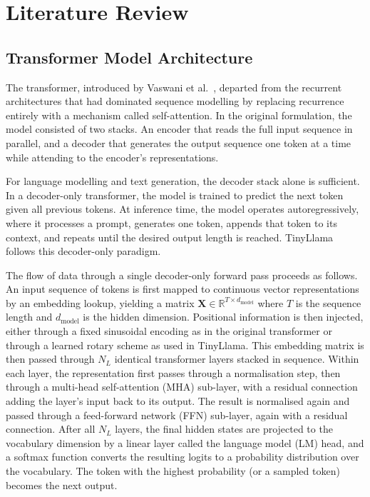 %

\chapter{Literature Review}
\label{ch:litreview}

\section{Transformer Model Architecture}
\label{sec:transformer_arch}

The transformer, introduced by Vaswani et al.\ \cite{vaswani2017attention}, departed
from the recurrent architectures that had dominated sequence modelling by
replacing recurrence entirely with a mechanism called self-attention. In the
original formulation, the model consisted of two stacks. An encoder that
reads the full input sequence in parallel, and a decoder that generates the
output sequence one token at a time while attending to the encoder's
representations.

For language modelling and text generation, the decoder stack alone is sufficient.
In a decoder-only transformer, the model is trained to predict the next
token given all previous tokens. At inference time, the model
operates autoregressively, where it processes a prompt, generates one token,
appends that token to its context, and repeats until the desired output
length is reached. TinyLlama follows this decoder-only paradigm.

The flow of data through a single decoder-only forward pass proceeds as
follows. An input sequence of tokens is first mapped to continuous vector
representations by an embedding lookup, yielding a matrix
$\mathbf{X} \in \mathbb{R}^{T \times d_{\text{model}}}$ where $T$ is the
sequence length and $d_{\text{model}}$ is the hidden dimension. Positional
information is then injected, either through a fixed sinusoidal encoding as
in the original transformer or through a learned rotary scheme as used in
TinyLlama. This embedding matrix is then passed through $N_L$ identical
transformer layers stacked in sequence. Within each layer, the
representation first passes through a normalisation step, then through
a multi-head self-attention (MHA) sub-layer, with a residual connection
adding the layer's input back to its output. The result is normalised again
and passed through a feed-forward network (FFN) sub-layer, again with a
residual connection. After all $N_L$ layers, the final hidden states are
projected to the vocabulary dimension by a linear layer called the language
model (LM) head, and a softmax function converts the resulting logits to a
probability distribution over the vocabulary. The token with the highest
probability (or a sampled token) becomes the next output.

